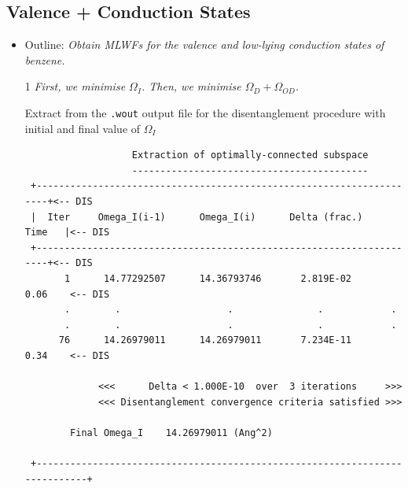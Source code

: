 \subsection*{Valence + Conduction States}
\begin{itemize}
\item Outline: {\it Obtain MLWFs for the valence and low-lying conduction states of benzene.}
\end{itemize}

\begin{itemize}
\item[1] {\it First, we minimise $\Omega_I$. Then, we minimise $\Omega_D + \Omega_{OD}$.}

Extract from the {\tt .wout} output file for the disentanglement procedure with initial and final value of $\Omega_I$
  \begin{tcolorbox}[floatplacement=h!,float,nobeforeafter,sharp corners,boxrule=0.5pt]
  {\small
\begin{verbatim}
                   Extraction of optimally-connected subspace
                   ------------------------------------------
 +---------------------------------------------------------------------+<-- DIS
 |  Iter     Omega_I(i-1)      Omega_I(i)      Delta (frac.)    Time   |<-- DIS
 +---------------------------------------------------------------------+<-- DIS
       1      14.77292507      14.36793746       2.819E-02      0.06    <-- DIS
       .		.					.				.			 .
       .		.					.				.			 .
      76      14.26979011      14.26979011       7.234E-11      0.34    <-- DIS

             <<<      Delta < 1.000E-10  over  3 iterations     >>>
             <<< Disentanglement convergence criteria satisfied >>>

        Final Omega_I    14.26979011 (Ang^2)

 +----------------------------------------------------------------------------+
\end{verbatim}
}
\end{tcolorbox}


\end{itemize}
